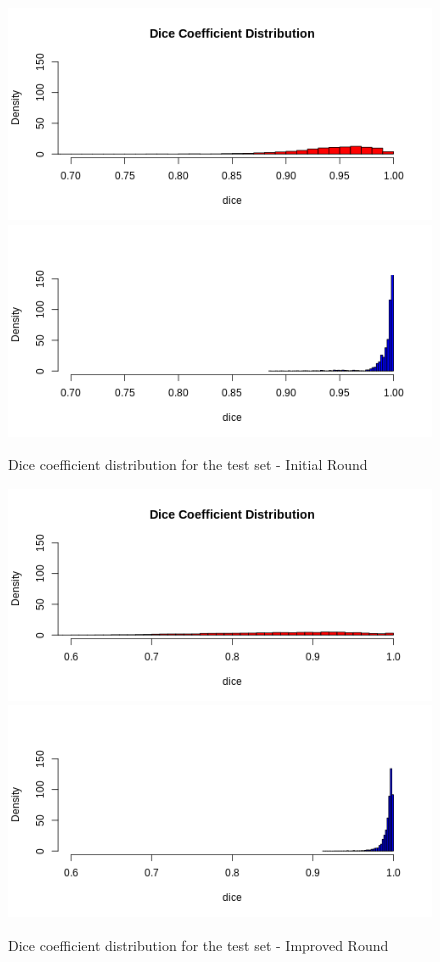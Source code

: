 \begin{figure}[h!]
    \centering
    \includegraphics[width=.65\linewidth]{Figures/v1-tst-dicedst-d.png}
    \includegraphics[width=.65\linewidth]{Figures/v1-tst-dicedst-r.png}
    \caption{Dice coefficient distribution for the test set - Initial Round}
    \label{fig:tst-dice-dist}
\end{figure}

\begin{figure}[h!]
    \centering
    \includegraphics[width=.65\linewidth]{Figures/v2-tst-dicedst-d.png}
    \includegraphics[width=.65\linewidth]{Figures/v2-tst-dicedst-r.png}
    \caption{Dice coefficient distribution for the test set - Improved Round}
    \label{fig:tst-dice-dist-2}
\end{figure}

